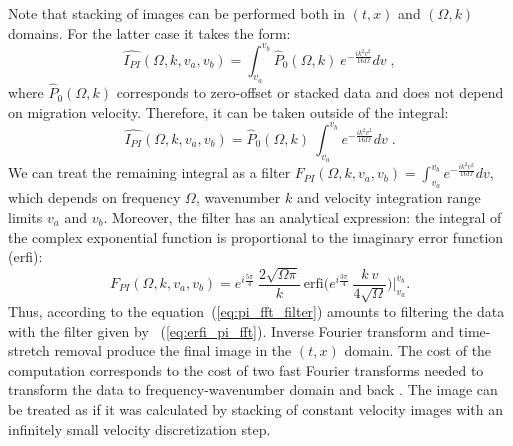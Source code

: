 Note that stacking of images can be performed both in $(t,x)$ and $(\Omega,k)$ domains. For the latter case it takes the form:
\begin{equation}
\label{eq:pi_fft}
\hat{I_{PI}}(\Omega,k,v_a,v_b) = \int_{v_a}^{v_b} \hat{P}_0(\Omega,k)\ e^{-\frac{i k^2 v^2 }{16\Omega}}dv\;,
\end{equation}
where $\hat{P}_0(\Omega,k)$ corresponds to zero-offset or stacked data and does not depend
on migration velocity. Therefore, it can be taken outside of the integral:
\begin{equation}
\label{eq:pi_fft_filter}
\hat{I_{PI}}(\Omega,k,v_a,v_b) = \hat{P}_0(\Omega,k)\ \int_{v_a}^{v_b} e^{-\frac{ i k^2 v^2 }{16\Omega}}dv \;.
\end{equation}
We can treat the remaining integral as a filter $F_{PI}(\Omega,k,v_a,v_b) = \int_{v_a}^{v_b} e^{-\frac{ i k^2 v^2 }{16\Omega}}dv $,
which depends on frequency $\Omega$,
wavenumber $k$ and velocity integration range limits $v_a$ and $v_b$. Moreover, the filter has an analytical
expression: the integral of
the complex exponential function is proportional to the imaginary error function (erfi): 
\begin{equation}
\label{eq:erfi_pi_fft}
F_{PI}(\Omega,k,v_a,v_b) = e^{i\frac{5\pi}{4}}\ \frac{2\sqrt{\Omega \pi}}{k}\ \mbox{erfi}\big(e^{i\frac{3\pi}{4}}\ \frac{k\ v}{4\sqrt{\Omega}}\big) \bigg|_{v_a}^{v_b}.
\end{equation}
Thus,  according to the equation~(\ref{eq:pi_fft_filter}) 
amounts to filtering the data with the filter given by ~(\ref{eq:erfi_pi_fft}).
Inverse Fourier transform and time-stretch removal produce the final  image in the $(t,x)$ domain.
The cost of the computation corresponds to the cost of two fast Fourier transforms needed to transform the data to 
frequency-wavenumber domain and back .
The  image can be treated as if it
was calculated by stacking of constant velocity images with an infinitely small velocity discretization step.

